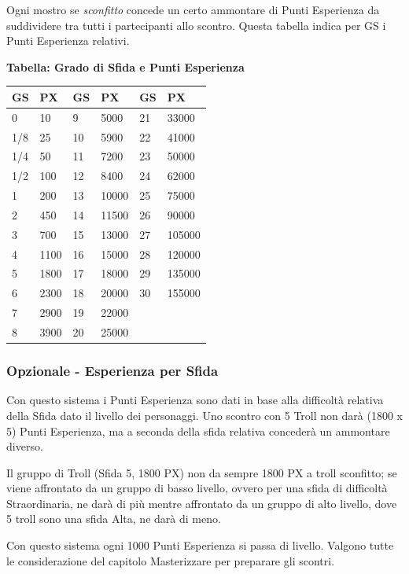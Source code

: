 \begin{multicols}{2}
Ogni mostro se \emph{sconfitto} concede un certo ammontare di Punti Esperienza da suddividere tra tutti i partecipanti allo scontro. Questa tabella indica per GS i Punti Esperienza relativi.

\textbf{Tabella: Grado di Sfida e Punti Esperienza}

\medskip

\noindent\begin{tabularx}{\linewidth}{Xl|Xl|Xl}
	\toprule
	\rowcolor{gray!20}\textbf{GS} & \textbf{PX} &\textbf{GS} & \textbf{PX} &\textbf{GS} & \textbf{PX}\\
	\toprule
	0& 10 &9& 5000& 21&33000\\
	\rowcolor{gray!20}1/8& 25 &10& 5900&22&41000\\
	1/4& 50 &11& 7200&23&50000\\
	\rowcolor{gray!20}1/2& 100 &12& 8400&24&62000\\
	1& 200 &13& 10000&25&75000\\
	\rowcolor{gray!20}2& 450&14& 11500&26&90000\\
	3& 700&15& 13000&27&105000\\
	\rowcolor{gray!20}4& 1100&16& 15000&28&120000\\
	5& 1800&17& 18000&29&135000\\
	\rowcolor{gray!20}6& 2300&18& 20000&30&155000\\
	7& 2900&19& 22000&&\\
	\rowcolor{gray!20}8& 3900&20& 25000&&
\end{tabularx}

\subsubsection{Opzionale - Esperienza per Sfida}

Con questo sistema i Punti Esperienza sono dati in base alla difficoltà relativa della Sfida dato il livello dei personaggi. Uno scontro con 5 Troll non darà (1800 x 5) Punti Esperienza, ma a seconda della sfida relativa concederà un ammontare diverso.

Il gruppo di Troll (Sfida 5, 1800 PX) non da sempre 1800 PX a troll sconfitto; se viene affrontato da un gruppo di basso livello, ovvero per una sfida di difficoltà Straordinaria, ne darà di più mentre affrontato da un gruppo di alto livello, dove 5 troll sono una sfida Alta, ne darà di meno.

Con questo sistema ogni 1000 Punti Esperienza si passa di livello. Valgono tutte le considerazione del capitolo Masterizzare per preparare gli scontri.


\end{multicols}
